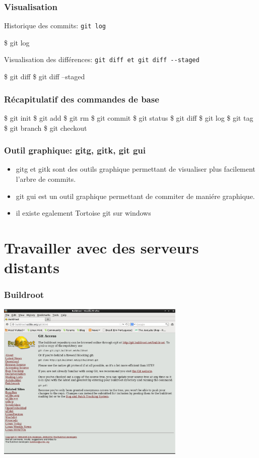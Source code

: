 \documentclass{beamer}
\begin{document}
\begin{frame}[fragile]\frametitle{Visualisation}
  Historique des commits: \verb|git log|

  \begin{semiverbatim}
  \$ \alert{git log}
  \end{semiverbatim}

  Visualisation des différences: \verb|git diff et git diff --staged|
  \begin{semiverbatim}
  \$ \alert{git diff}
  \$ \alert{git diff --staged}
  \end{semiverbatim}

\end{frame}

\begin{frame}[fragile]
  \frametitle{Récapitulatif des commandes de base}
  \begin{semiverbatim}
    \$ git init
    \$ git add
    \$ git rm
    \$ git commit
    \$ git status
    \$ git diff
    \$ git log
    \$ git tag
    \$ git branch
    \$ git checkout
  \end{semiverbatim}
\end{frame}

\begin{frame}
  \frametitle{Outil graphique: gitg, gitk, git gui}
  \begin{itemize}
  \item gitg et gitk sont des outils graphique permettant de visualiser plus facilement l'arbre de commits.
  \item git gui est un outil graphique permettant de commiter de maniére graphique.
  \item il existe egalement Tortoise git sur windows
  \end{itemize}
\end{frame}


\section{Travailler avec des serveurs distants}
\begin{frame}
  \frametitle{Buildroot}
  \includegraphics[width=9cm]{imgs/buildroot.eps}
\end{frame}
\end{document}
